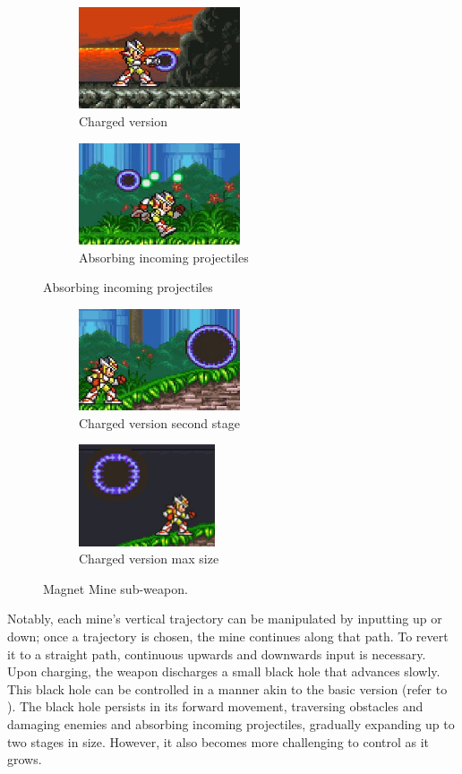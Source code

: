 	\begin{figure}[htp]
		\ContinuedFloat
		\centering
	\begin{subfigure}{0.4\linewidth}
		\centering
		\includegraphics[height=3cm]{figures/X2/weapons/M_mine_3.png}	
		\caption{Charged version}
	\end{subfigure}
	\begin{subfigure}{0.4\linewidth}
		\centering
		\includegraphics[height=3cm]{figures/X2/weapons/M_mine_4.png}	
		\caption{Absorbing incoming projectiles}
	\end{subfigure}
\end{figure}
\begin{figure}[htp]
	\ContinuedFloat
	\centering
	\begin{subfigure}{0.4\linewidth}
		\centering
		\includegraphics[height=3cm]{figures/X2/weapons/M_mine_5.png}	
		\caption{Charged version second stage}
	\end{subfigure}
	\begin{subfigure}{0.4\linewidth}
		\centering
		\includegraphics[height=3cm]{figures/X2/weapons/M_mine_6.png}	
		\caption{Charged version max size}
	\end{subfigure}
	\caption{Magnet Mine sub-weapon.}
\end{figure}
 Notably, each mine's vertical trajectory can be manipulated by inputting up or down; once a trajectory is chosen, the mine continues along that path. To revert it to a straight path, continuous upwards and downwards input is necessary. Upon charging, the weapon discharges a small black hole that advances slowly. This black hole can be controlled in a manner akin to the basic version (refer to ). The black hole persists in its forward movement, traversing obstacles and damaging enemies and absorbing incoming projectiles, gradually expanding up to two stages in size. However, it also becomes more challenging to control as it grows.


